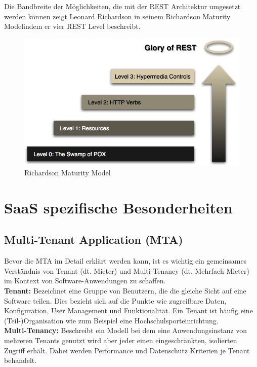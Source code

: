 		Die Bandbreite der Möglichkeiten, die mit der REST Architektur umgesetzt werden können zeigt Leonard Richardson in seinem \textacutedbl Richardson Maturity Model\textgravedbl  indem er vier REST Level beschreibt.
	
		\begin{figure}[h]
			\centering
			\includegraphics[width=0.7\linewidth]{images/Richardson_Maturity_Model}
			\caption{Richardson Maturity Model}
			\label{fig:Richardson_Maturity_Model}
		\end{figure}
		
		\cite[vgl.][]{Fowler.2010}


\section{SaaS spezifische Besonderheiten}
\subsection{Multi-Tenant Application (MTA)}
Bevor die MTA im Detail erklärt werden kann, ist es wichtig ein gemeinsames Verständnis von Tenant (dt. Mieter) und Multi-Tenancy (dt. Mehrfach Mieter) im Kontext von Software-Anwendungen zu schaffen. \cite*[vgl. ][S.2]{Krebs.2012}
\\

\textbf{Tenant:} Bezeichnet eine Gruppe von Benutzern, die die gleiche Sicht auf eine Software teilen. Dies bezieht sich auf die Punkte wie zugreifbare Daten, Konfiguration, User Management und Funktionalität. Ein Tenant ist häufig eine (Teil-)Organisation wie zum Beispiel eine Hochschulsporteinrichtung. \\ 

\textbf{Multi-Tenancy:} Beschreibt ein Modell bei dem eine Anwendungsinstanz von mehreren Tenants genutzt wird aber jeder einen eingeschränkten, isolierten Zugriff erhält. Dabei werden Performance und Datenschutz Kriterien je Tenant behandelt. \\ 

